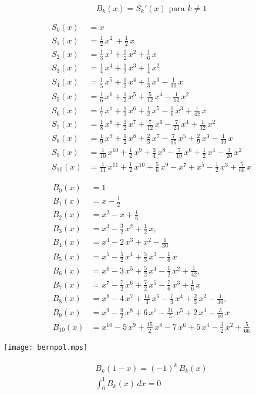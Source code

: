\documentclass{article}
\begin{document}
\vspace{2em}

\[ B_k (x) = S_k' (x) \text{ para }k\ne 1 \]

\pagebreak

\begin{minipage}[t]{0.5\textwidth}\small
\begin{align*}
S_0 (x) & = x\\
S_1 (x) & = \frac{1}{2}\,x^2\,+\frac{1}{2}\,x\\
S_2 (x) & = \frac{1}{3}\,x^3+\frac{1}{2}\,x^2+\frac{1}{6}\,x\\
S_3 (x) & = \frac{1}{4}\,x^4+\frac{1}{2}\,x^3+\frac{1}{4}\,x^2\\
S_4 (x) & = \frac{1}{5}\,x^5+\frac{1}{2}\,x^4+\frac{1}{3}\,x^3-\frac{1}{30}\,x\\
S_5 (x) & = \frac{1}{6}\,x^6+\frac{1}{2}\,x^5+\frac{5}{12}\,x^4-\frac{1}{12}\,x^2\\
S_6 (x) & = \frac{1}{7}\,x^7+\frac{1}{2}\,x^6+\frac{1}{2}\,x^5-\frac{1}{6}\,x^3+\frac{1}{42}\,x\\
S_7 (x) & = \frac{1}{8}\,x^8+\frac{1}{2}\,x^7+\frac{7}{12}\,x^6-\frac{7}{24}\,x^4+\frac{1}{12}\,x^2\\
S_8 (x) & = \frac{1}{9}\,x^9+\frac{1}{2}\,x^8+\frac{2}{3}\,x^7-\frac{7}{15}\,x^5+\frac{2}{9}\,x^3-\frac{1}{30}\,x\\
S_9 (x) & = \frac{1}{10}\,x^{10}+\frac{1}{2}\,x^9+\frac{3}{4}\,x^8-\frac{7}{10}\,x^6+\frac{1}{2}\,x^4-\frac{3}{20}\,x^2\\
S_{10} (x) & = \frac{1}{11}\,x^{11}+\frac{1}{2}\,x^{10}+\frac{5}{6}\,x^9-x^7+x^5-\frac{1}{2}\,x^3+\frac{5}{66}\,x
\end{align*}
\end{minipage}
\begin{minipage}[t]{0.5\textwidth}\small
\begin{align*}
B_0 (x) & = 1\\
B_1 (x) & = x - \frac{1}{2}\\
B_2 (x) & = x^2 - x + \frac{1}{6}\\
B_3 (x) & = x^3 - \frac{3}{2}\,x^2 + \frac{1}{2}\,x,\\
B_4 (x) & = x^4 - 2\,x^3 + x^2 - \frac{1}{30}\\
B_5 (x) & = x^5 - \frac{5}{2}\,x^4 + \frac{5}{3}\,x^3 - \frac{1}{6}\,x\\
B_6 (x) & = x^6 - 3\,x^5 + \frac{5}{2}\,x^4 - \frac{1}{2}\,x^2 + \frac{1}{42},\\
B_7 (x) & = x^7 - \frac{7}{2}\,x^6 + \frac{7}{2}\,x^5 - \frac{7}{6}\,x^3 + \frac{1}{6}\,x\\
B_8 (x) & = x^8 - 4\,x^7 + \frac{14}{3}\,x^6 - \frac{7}{3}\,x^4 + \frac{2}{3}\,x^2 - \frac{1}{30},\\
B_9 (x) & = x^9 - \frac{9}{2}\,x^8 + 6\,x^7 - \frac{21}{5}\,x^5 + 2\,x^3 - \frac{3}{10}\,x\\
B_{10} (x) & = x^{10} - 5\,x^9 + \frac{15}{2}\,x^8 - 7\,x^6 + 5\,x^4 - \frac{3}{2}\,x^2 + \frac{5}{66}
\end{align*}
\end{minipage}

\vspace{2em}

\begin{center}
\texttt{[image: bernpol.mps]}
\end{center}

\begin{gather*}
B_k (1-x) = (-1)^k\,B_k (x)\\
\int_0^1 B_k (x)\,dx = 0
\end{gather*}
\end{document}
